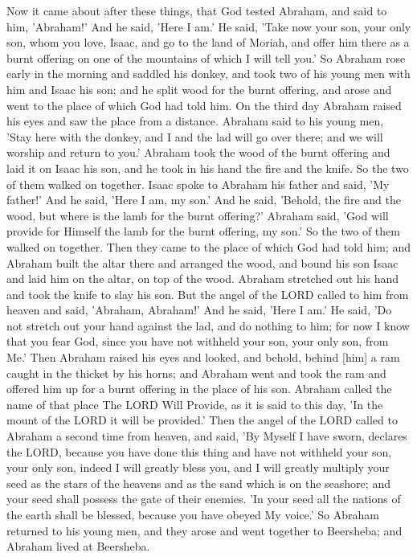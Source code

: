 \begin{scripture}[Genesis 22:1-19]
    Now it came about after these things, that God tested Abraham, and said to him, 'Abraham!' And he said, 'Here I am.'
    He said, 'Take now your son, your only son, whom you love, Isaac, and go to the land of Moriah, and offer him there as a burnt offering on one of the mountains of which I will tell you.'
    So Abraham rose early in the morning and saddled his donkey, and took two of his young men with him and Isaac his son; and he split wood for the burnt offering, and arose and went to the place of which God had told him.
    On the third day Abraham raised his eyes and saw the place from a distance.
    Abraham said to his young men, 'Stay here with the donkey, and I and the lad will go over there; and we will worship and return to you.'
    Abraham took the wood of the burnt offering and laid it on Isaac his son, and he took in his hand the fire and the knife. So the two of them walked on together.
    Isaac spoke to Abraham his father and said, 'My father!' And he said, 'Here I am, my son.' And he said, 'Behold, the fire and the wood, but where is the lamb for the burnt offering?'
    Abraham said, 'God will provide for Himself the lamb for the burnt offering, my son.' So the two of them walked on together.
    Then they came to the place of which God had told him; and Abraham built the altar there and arranged the wood, and bound his son Isaac and laid him on the altar, on top of the wood.
    Abraham stretched out his hand and took the knife to slay his son.
    But the angel of the LORD called to him from heaven and said, 'Abraham, Abraham!' And he said, 'Here I am.'
    He said, 'Do not stretch out your hand against the lad, and do nothing to him; for now I know that you fear God, since you have not withheld your son, your only son, from Me.'
    Then Abraham raised his eyes and looked, and behold, behind [him] a ram caught in the thicket by his horns; and Abraham went and took the ram and offered him up for a burnt offering in the place of his son.
    Abraham called the name of that place The LORD Will Provide, as it is said to this day, 'In the mount of the LORD it will be provided.'
    Then the angel of the LORD called to Abraham a second time from heaven,
    and said, 'By Myself I have sworn, declares the LORD, because you have done this thing and have not withheld your son, your only son,
    indeed I will greatly bless you, and I will greatly multiply your seed as the stars of the heavens and as the sand which is on the seashore; and your seed shall possess the gate of their enemies.
    'In your seed all the nations of the earth shall be blessed, because you have obeyed My voice.'
    So Abraham returned to his young men, and they arose and went together to Beersheba; and Abraham lived at Beersheba.
\end{scripture}

